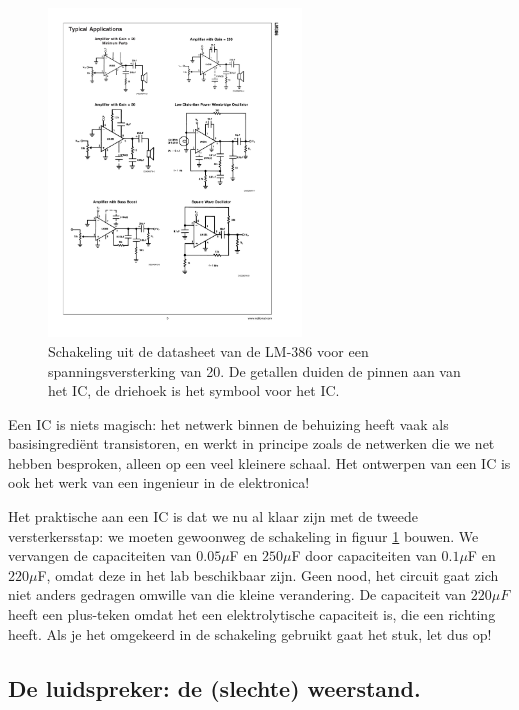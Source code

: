 \documentclass{article}
\begin{document}
			\begin{figure}[htbp]
				\centering
				\includegraphics[width=0.6\textwidth]{IC_versterker}
				\caption{Schakeling uit de datasheet van de LM-386 voor een spanningsversterking van 20. De getallen duiden de pinnen aan van het IC, de driehoek is het symbool voor het IC. }
				\label{fig:IC_versterker}
			\end{figure}

			Een IC is niets magisch: het netwerk binnen de behuizing heeft vaak als basisingredi\"ent transistoren, en werkt in principe zoals de netwerken die we net hebben besproken, alleen op een veel kleinere schaal. Het ontwerpen van een IC is ook het werk van een ingenieur in de elektronica!

			Het praktische aan een IC is dat we nu al klaar zijn met de tweede versterkersstap: we moeten gewoonweg de schakeling in figuur \ref{fig:IC_versterker} bouwen. We vervangen de capaciteiten van $0.05 \mu$F en $250\mu$F door capaciteiten van $0.1\mu$F en $220\mu$F, omdat deze in het lab beschikbaar zijn. Geen nood,  het circuit gaat zich niet anders gedragen omwille van die kleine verandering. De capaciteit van $220\mu F$ heeft een plus-teken omdat het een elektrolytische capaciteit is, die een richting heeft. Als je het omgekeerd in de schakeling gebruikt gaat het stuk, let dus op!

		\subsection{De luidspreker: de (slechte) weerstand.} 
		
\end{document}
